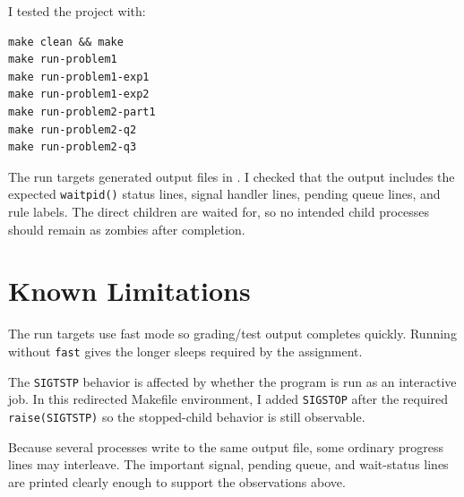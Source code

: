 \documentclass[11pt]{article}
\begin{document}
I tested the project with:

\begin{verbatim}
make clean && make
make run-problem1
make run-problem1-exp1
make run-problem1-exp2
make run-problem2-part1
make run-problem2-q2
make run-problem2-q3
\end{verbatim}

The run targets generated output files in . I checked that the output
includes the expected \texttt{waitpid()} status lines, signal handler lines, pending
queue lines, and rule labels. The direct children are waited for, so no intended
child processes should remain as zombies after completion.

\section{Known Limitations}

The run targets use fast mode so grading/test output completes quickly. Running
without \texttt{fast} gives the longer sleeps required by the assignment.

The \texttt{SIGTSTP} behavior is affected by whether the program is run as an
interactive job. In this redirected Makefile environment, I added \texttt{SIGSTOP}
after the required \texttt{raise(SIGTSTP)} so the stopped-child behavior is still
observable.

Because several processes write to the same output file, some ordinary progress
lines may interleave. The important signal, pending queue, and wait-status lines are
printed clearly enough to support the observations above.
\end{document}
